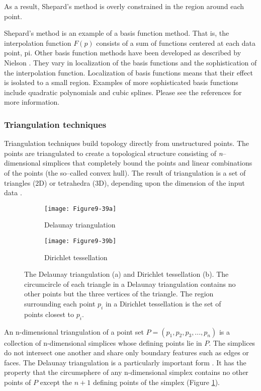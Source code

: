 As a result, Shepard's method is overly constrained in the region around each point.

Shepard's method is an example of a basis function method. That is, the interpolation function $F(p)$ consists of a sum of functions centered at each data point, pi. Other basis function methods have been developed as described by Nielson \cite{Nielson91a}. They vary in localization of the basis functions and the sophistication of the interpolation function. Localization of basis functions means that their effect is isolated to a small region. Examples of more sophisticated basis functions include quadratic polynomials and cubic splines. Please see the references for more information.

\subsubsection{Triangulation techniques}

Triangulation techniques build topology directly from unstructured points. The points are triangulated to create a topological structure consisting of \emph{n}--dimensional simplices that completely bound the points and linear combinations of the points (the so--called convex hull). The result of triangulation is a set of triangles (2D) or tetrahedra (3D), depending upon the dimension of the input data \cite{Lawson86}.

\begin{figure}[htb]
    \centering
	\begin{subfigure}[h]{0.48\linewidth}
		\texttt{[image: Figure9-39a]}
		\captionsetup{justification=centering}
		\caption{Delaunay triangulation}
		\label{fig:Figure9-39a}
	\end{subfigure}
	\hfill
	\begin{subfigure}[h]{0.48\linewidth}
		\texttt{[image: Figure9-39b]}
		\captionsetup{justification=centering}
		\caption{Dirichlet tessellation}
		\label{fig:Figure9-39b}
	\end{subfigure}
	\caption{The Delaunay triangulation (a) and Dirichlet tessellation (b). The circumcircle of each triangle in a Delaunay triangulation contains no other points but the three vertices of the triangle. The region surrounding each point $p_i$ in a Dirichlet tessellation is the set of points closest to $p_i$.}\label{fig:Figure9-39}
\end{figure}

An n-dimensional triangulation of a point set $P = (p_1, p_2, p_3, ..., p_n)$ is a collection of n-dimensional simplices whose defining points lie in $P$. The simplices do not intersect one another and share only boundary features such as edges or faces. The Delaunay triangulation is a particularly important form \cite{Bowyer81} \cite{Watson81}. It has the property that the circumsphere of any n-dimensional simplex contains no other points of $P$ except the $n+1$ defining points of the simplex (Figure \ref{fig:Figure9-39a}).

